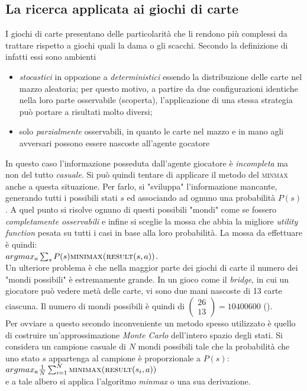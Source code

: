 \subsection{La ricerca applicata ai giochi di carte}

I giochi di carte presentano delle particolarità che li rendono più complessi da trattare rispetto a giochi quali la dama o gli scacchi.
Secondo la definizione di \cite{randw} infatti essi sono ambienti
\begin{itemize}
   \item \emph{stocastici} in oppozione a \emph{deterministici} essendo la distribuzione delle carte nel mazzo aleatoria; per questo motivo, a partire da due configurazioni identiche nella loro parte osservabile (scoperta), l'applicazione di una stessa strategia può portare a risultati molto diversi;
   \item solo \emph{parzialmente} osservabili, in quanto le carte nel mazzo e in mano agli avversari possono essere nascoste all'agente gocatore
\end{itemize}

In questo caso l'informazione posseduta dall'agente giocatore è \emph{incompleta} ma non del tutto \emph{casuale}.
Si può quindi tentare di applicare il metodo del \textsc{minmax} anche a questa situazione.
Per farlo, si "sviluppa" l'informazione mancante, generando tutti i possibili stati $s$ ed associando ad ognuno una probabilità $P(s)$.
A quel punto si risolve ognuno di questi possibili "mondi" come se fossero \emph{completamente osservabili} e infine si sceglie la mossa che abbia la migliore \emph{utility function} pesata su tutti i casi in base alla loro probabilità.
La mossa da effettuare è quindi:\\

$ argmax_a \sum_{s} P(s) \textsc{minimax(result}(s,a)) $.\\

Un ulteriore problema è che nella maggior parte dei giochi di carte il numero dei "mondi possibili" è estremamente grande.
In un gioco come il \emph{bridge}, in cui un giocatore può vedere metà delle carte, vi sono due mani nascoste di 13 carte ciascuna.
Il numero di mondi possibili è quindi di $ \left(\! \begin{array}{c} 26 \\  13\end{array}\!\right)  = 10 400 600 $ (\cite{randw}).\\
Per ovviare a questo secondo inconveniente un metodo spesso utilizzato è quello di costruire un'approssimazione \emph{Monte Carlo} dell'intero spazio degli stati.
Si considera un campione casuale di $N$ mondi possibili tale che la probabilità che uno stato $s$ appartenga al campione è proporzionale a $P(s)$:\\

$argmax_a \frac{1}{N} \sum_{i=1}^{N}  \textsc{minimax(result}(s_i,a)) $ \cite{randw}\\

e a tale albero si applica l'algoritmo \emph{minmax} o una sua derivazione.
